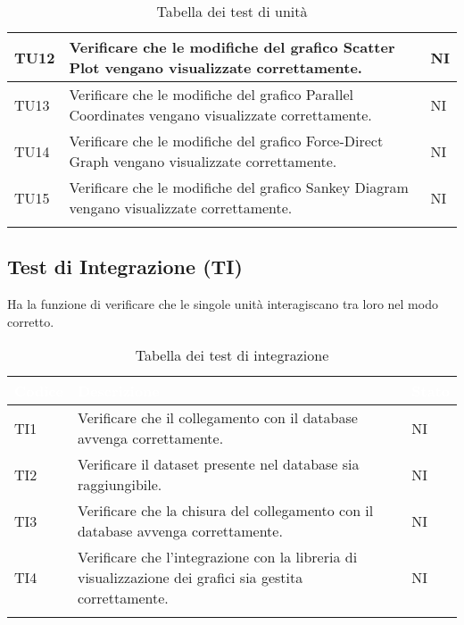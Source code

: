 \begin{center}
\begin{longtable}{|p{1.5cm}|p{11cm}|p{1cm}|}
            TU12 & Verificare che le modifiche del grafico Scatter Plot vengano visualizzate correttamente. & NI\\ \hline
            \rowcolor[HTML]{EFEFEF}
            TU13 & Verificare che le modifiche del grafico Parallel Coordinates vengano visualizzate correttamente. & NI\\ \hline
            \rowcolor[HTML]{C0C0C0}
            TU14 & Verificare che le modifiche del grafico Force-Direct Graph vengano visualizzate correttamente. & NI\\ \hline
            \rowcolor[HTML]{EFEFEF}
            TU15 & Verificare che le modifiche del grafico Sankey Diagram vengano visualizzate correttamente. & NI\\ \hline
            \caption{Tabella dei test di unità}
        \end{longtable}
    \end{center}

    \subsection{Test di Integrazione (TI)} Ha la funzione di verificare che le singole unità interagiscano tra loro nel modo corretto.
    \begin{center}
        \renewcommand\arraystretch{1.5}
        \centering
        \begin{longtable}{|p{1.5cm}|p{11cm}|p{1cm}|}
        \hline
        \rowcolor[HTML]{036400}
        \textcolor{white}{\textbf{Codice}} & \textcolor{white}{\textbf{Descrizione}} & \textcolor{white}{\textbf{Stato}} \\ \hline
            \rowcolor[HTML]{EFEFEF}
            TI1 & Verificare che il collegamento con il database avvenga correttamente. & NI\\ \hline
            \rowcolor[HTML]{C0C0C0}
            TI2 & Verificare il dataset presente nel database sia raggiungibile. & NI\\ \hline
            \rowcolor[HTML]{EFEFEF}
            TI3 & Verificare che la chisura del collegamento con il database avvenga correttamente. & NI\\ \hline
            \rowcolor[HTML]{C0C0C0}
            TI4 & Verificare che l’integrazione con la libreria di visualizzazione dei grafici sia gestita correttamente. & NI\\ \hline   
            \caption{Tabella dei test di integrazione}
        \end{longtable}
    \end{center}

